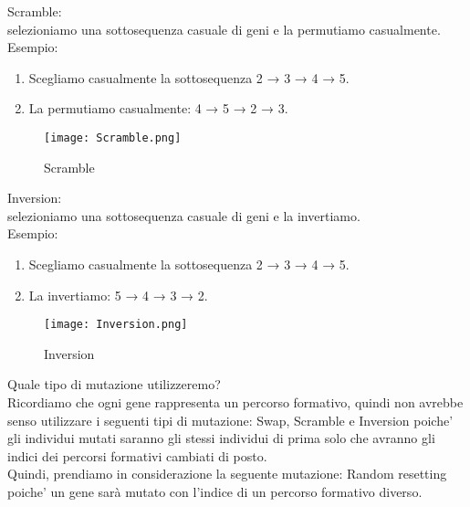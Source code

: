 \documentclass[10pt,a4paper]{article}
\begin{document}
    Scramble:\\
    selezioniamo una sottosequenza casuale di geni e la permutiamo casualmente.
    Esempio:\\
    \begin{enumerate}
      \item Scegliamo casualmente la sottosequenza 2 → 3 → 4 → 5.
      \item La permutiamo casualmente: 4 → 5 → 2 → 3.
    \end{enumerate}
    \begin{figure}[h!]
      \centering
      \caption{Scramble}
      \texttt{[image: Scramble.png]}
      \label{Scramble}
    \end{figure}
     
    Inversion:\\
    selezioniamo una sottosequenza casuale di geni e la invertiamo.\\
    Esempio:\\
    \begin{enumerate}
      \item Scegliamo casualmente la sottosequenza 2 → 3 → 4 → 5.
      \item La invertiamo: 5 → 4 → 3 → 2.
    \end{enumerate}
    \begin{figure}[h!]
      \centering
      \caption{Inversion}
      \texttt{[image: Inversion.png]}
      \label{Inversion}
    \end{figure}
    
    Quale tipo di mutazione utilizzeremo?\\
    Ricordiamo che ogni gene rappresenta un percorso formativo, quindi non avrebbe senso utilizzare i 
    seguenti tipi di mutazione: Swap, Scramble e Inversion poiche' gli individui mutati saranno gli 
    stessi individui di prima solo che avranno gli indici dei percorsi formativi cambiati di posto.\\
    Quindi, prendiamo in considerazione la seguente mutazione: Random resetting poiche' un gene sarà 
    mutato con l'indice di un percorso formativo diverso.

    
      
\end{document}
